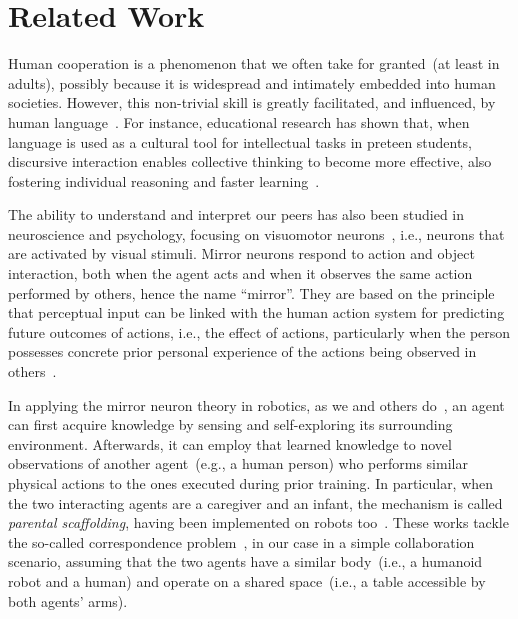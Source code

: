 
\section{Related Work}
\label{sec:related_work}

Human cooperation is a phenomenon that we often take for granted~(at least in adults), possibly because it is widespread and intimately embedded into human societies.
However, this non-trivial skill is greatly facilitated, and influenced, by human language~\cite{mueller:2000:psych}.
For instance, educational research has shown that, when language is used as a cultural tool for intellectual tasks in preteen students, discursive interaction enables collective thinking to become more effective, also fostering individual reasoning and faster learning~\cite{rojas:2003:ijer}.

The ability to understand and interpret our peers has also been studied in neuroscience and psychology, focusing on visuomotor neurons~\cite{rizzolatti:2001:nrn}, i.e., neurons that are activated by visual stimuli.
Mirror neurons respond to action and object interaction, both when the agent acts and when it observes the same action performed by others, hence the name ``mirror''.
They are based on the principle that perceptual input can be linked with the human action system for predicting future outcomes of actions, i.e., the effect of actions, particularly when the person possesses concrete prior personal experience of the actions being observed in others~\cite{aglioti:2008:basketball,knoblich:2001:psychsci}.

In applying the mirror neuron theory in robotics, as we and others do~\cite{gazzola:2007:neuroimage,lopes:2009:ab}, an agent can first acquire knowledge by sensing and self-exploring its surrounding environment.
Afterwards, it can employ that learned knowledge to novel observations of another agent~(e.g., a human person) who performs similar physical actions to the ones executed during prior training.
In particular, when the two interacting agents are a caregiver and an infant, the mechanism is called \emph{parental scaffolding}, having been implemented on robots too~\cite{ugur:2015:robotica,ugur:2015:tamd}.
These works tackle the so-called correspondence problem~\cite{nehaniv:2002:correspondence}, in our case in a simple collaboration scenario, assuming that the two agents have a similar body~(i.e., a humanoid robot and a human) and operate on a shared space~(i.e., a table accessible by both agents' arms).

